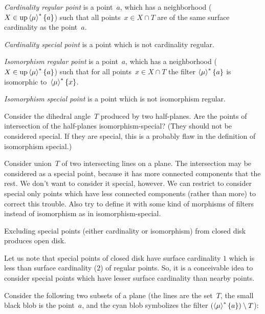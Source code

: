\begin{defn}
\emph{Cardinality regular point} is a point~$a$, which has a neighborhood
($X\in\operatorname{up}\left\langle \mu\right\rangle ^{\ast}\{a\}$) such that all points~$x\in X\cap T$
are of the same surface cardinality as the point~$a$.

\emph{Cardinality special point} is a point which is not cardinality regular.
\end{defn}

\begin{defn}
\emph{Isomorphism regular point} is a point~$a$, which has a neighborhood
($X\in\operatorname{up}\left\langle \mu\right\rangle ^{\ast}\{a\}$) such that for all points~$x\in X\cap T$
the filter $\left\langle \mu\right\rangle ^{\ast}\{a\}$ is isomorphic
to~$\left\langle \mu\right\rangle ^{\ast}\{x\}$.

\emph{Isomorphism special point} is a point which is not isomorphism regular.
\end{defn}


Consider the dihedral angle~$T$ produced by two half-planes. Are the points of
intersection of the half-planes isomorphism-special? (They should not
be considered special. If they are special, this is a probably flaw in
the definition of isomorphism special.)

Consider union~$T$ of two intersecting lines on a plane. The intersection
may be considered as a special point, because it has more connected
components that the rest. We don't want to consider it special, however.
We can restrict to consider special only points which have less connected
components (rather than more) to correct this trouble. Also try to define
it with some kind of morphisms of filters instead of isomorphism as in
isomorphism-special.

\begin{xca}
Excluding special points (either cardinality or isomorphism) from closed disk
produces open disk.
\end{xca}

Let us note that special points of closed disk have surface cardinality
$1$ which is less than surface cardinality ($2$) of regular points.
So, it is a conceivable idea to consider special points which have
lesser surface cardinality than nearby points.

Consider the following two subsets of a plane (the lines are the
set~$T$, the small black blob is the point~$a$, and the cyan
blob symbolizes the filter $(\left\langle \mu\right\rangle ^{\ast}\{a\})\setminus T$):


